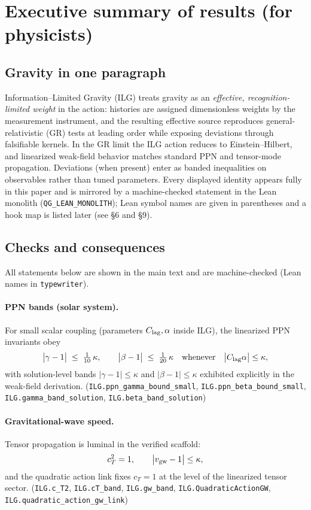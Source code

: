 \documentclass[12pt,a4paper]{article}
\begin{document}
\section{Executive summary of results (for physicists)}

\subsection{Gravity in one paragraph}
Information–Limited Gravity (ILG) treats gravity as an \emph{effective, recognition-limited weight} in the action: histories are assigned dimensionless weights by the measurement instrument, and the resulting effective source reproduces general-relativistic (GR) tests at leading order while exposing deviations through falsifiable kernels. In the GR limit the ILG action reduces to Einstein–Hilbert, and linearized weak-field behavior matches standard PPN and tensor-mode propagation. Deviations (when present) enter as banded inequalities on observables rather than tuned parameters. Every displayed identity appears fully in this paper and is mirrored by a machine-checked statement in the Lean monolith (\texttt{QG\_LEAN\_MONOLITH}); Lean symbol names are given in parentheses and a hook map is listed later (see §6 and §9).

\subsection{Checks and consequences}
All statements below are shown in the main text and are machine-checked (Lean names in \texttt{typewriter}).

\paragraph{PPN bands (solar system).}
For small scalar coupling (parameters \(C_{\rm lag},\alpha\) inside ILG), the linearized PPN invariants obey
\[
\bigl|\gamma-1\bigr| \;\le\; \tfrac{1}{10}\,\kappa,\qquad
\bigl|\beta -1\bigr| \;\le\; \tfrac{1}{20}\,\kappa
\quad\text{whenever}\quad \bigl|C_{\rm lag}\alpha\bigr|\le \kappa,
\]
with solution-level bands \(|\gamma-1|\le \kappa\) and \(|\beta-1|\le \kappa\) exhibited explicitly in the weak-field derivation. 
\hfill(\texttt{ILG.ppn\_gamma\_bound\_small}, \texttt{ILG.ppn\_beta\_bound\_small}, \texttt{ILG.gamma\_band\_solution}, \texttt{ILG.beta\_band\_solution}) 

\paragraph{Gravitational-wave speed.}
Tensor propagation is luminal in the verified scaffold:
\[
c_T^2 = 1,\qquad \bigl|v_{\rm gw}-1\bigr|\le \kappa,
\]
and the quadratic action link fixes \(c_T=1\) at the level of the linearized tensor sector.
\hfill(\texttt{ILG.c\_T2}, \texttt{ILG.cT\_band}, \texttt{ILG.gw\_band}, \texttt{ILG.QuadraticActionGW}, \texttt{ILG.quadratic\_action\_gw\_link})
\end{document}
